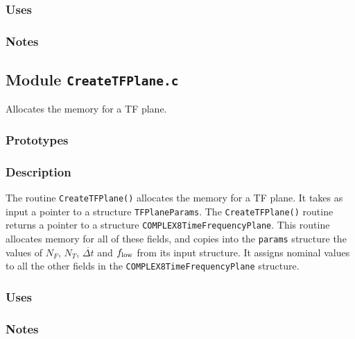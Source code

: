 \subsubsection*{Uses}

\subsubsection*{Notes}

\vfill{\footnotesize}

\newpage
\subsection{Module \texttt{CreateTFPlane.c}}
\label{ss:CreateTFPlane.c}

Allocates the memory for a TF plane.

\subsubsection*{Prototypes}
\vspace{0.1in}


\subsubsection*{Description}

The routine \verb+CreateTFPlane()+ allocates the memory for a TF plane.  It
takes as input a pointer to a structure \verb+TFPlaneParams+.  The
\verb+CreateTFPlane()+ routine returns a pointer to a structure
\verb+COMPLEX8TimeFrequencyPlane+.    This routine allocates memory for all of
these fields, and copies into the \verb+params+ structure the values of $N_F$,
$N_T$, ${\overline {\Delta t}}$ and $f_{\rm low}$ from its input structure.
It assigns nominal values to all the other fields in the
\verb+COMPLEX8TimeFrequencyPlane+ structure. 

\subsubsection*{Uses}

\subsubsection*{Notes}


